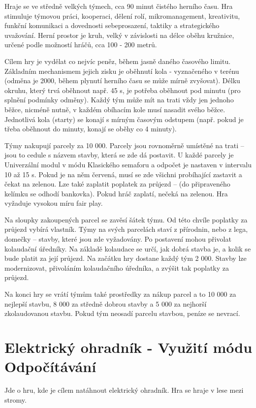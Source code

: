 Hraje se ve středně velkých týmech, cca 90 minut čistého herního času. Hra stimuluje týmovou práci, kooperaci, dělení rolí, mikromanagement, kreativitu, funkční komunikaci a dovednosti sebeprosazení, taktiky a strategického 
uvažování. Herní prostor je kruh, velký v závislosti na délce oběhu kružnice, určené podle možností hráčů, cca 100 - 200 metrů.

Cílem hry je vydělat co nejvíc peněz, během jasně daného časového limitu. Základním mechanismem jejich zisku je oběhnutí kola - vyznačeného v terénu (odměna je 2000, během plynutí herního času se může mírně zvyšovat). Délku 
okruhu, který trvá oběhnout např. 45 s,  je potřeba oběhnout pod minutu (pro splnění podmínky odměny). Každý tým může mít na trati vždy jen jednoho běžce, nicméně nutně, v každém obíhacím kole musí nasadit svého běžce. Jednotlivá 
kola (starty) se konají s mírným časovým odstupem (např. pokud je třeba oběhnout do minuty, konají se oběhy co 4 minuty).

Týmy nakupují parcely za 10 000. Parcely jsou rovnoměrně umístěné na trati – jsou to cedule s názvem stavby, která se zde dá postavit. U každé parcely je Univerzální modul v módu Klasického semaforu a odpočet je nastaven v intervalu 
10 až 15 s. 
Pokud je na něm červená, musí se zde všichni probíhající zastavit a čekat na zelenou. Lze také zaplatit poplatek za průjezd – (do připraveného kelímku se odhodí bankovka). Pokud hráč zaplatí, nečeká na zelenou. Hra vyžaduje vysokou 
míru fair play. 

Na sloupky zakoupených parcel se zavěsí šátek týmu. Od této chvíle poplatky za průjezd vybírá vlastník. Týmy na svých parcelách staví z přírodnin, nebo z lega, domečky – stavby, které jsou zde vyžadovány. Po postavení mohou přivolat 
kolaudační 
úředníky. Na základě kolaudace se určí, jak dobrá stavba je, a kolik se bude platit za její průjezd. Na začátku hry dostane každý tým 2 000. Stavby lze modernizovat, přivoláním kolaudačního úředníka, a zvýšit tak poplatky za průjezd. 

Na konci hry se vrátí týmům také prostředky za nákup parcel a to 10 000 za nejlepší stavbu, 8 000 za středně dobrou stavby a 5 000 za nejhorší zkolaudovanou stavbu. Pokud tým neosadí parcelu stavbou, peníze se nevrací. 


\newpage
\section{Elektrický ohradník - Využití módu Odpočítávání}
Jde o hru, kde je cílem natáhnout elektrický ohradník. Hra se hraje v lese mezi stromy.

